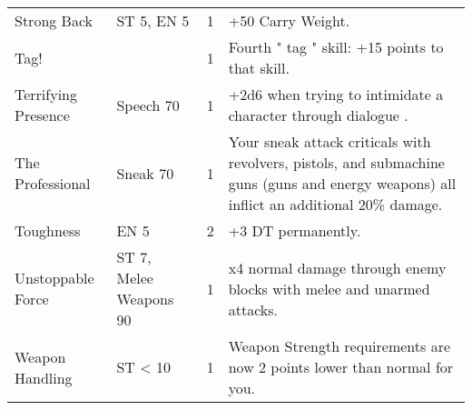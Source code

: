 \begin{longtable}{|p{3.3cm}|p{3.1cm}|p{1.2cm}|p{8.4cm}|}
Strong Back  & ST 5, EN 5  & 1  & +50 Carry Weight.  \\
Tag!  &  & 1  & Fourth  " tag "  skill: +15 points to that skill.  \\
Terrifying Presence  & Speech 70  & 1  & +2d6 when trying to intimidate a character through dialogue .  \\
The Professional  & Sneak 70  & 1  & Your sneak attack criticals with revolvers, pistols, and submachine guns (guns and energy weapons) all inflict an additional 20\% damage.  \\
Toughness  & EN 5  & 2  & +3 DT permanently.  \\
Unstoppable Force  & ST 7, Melee Weapons 90  & 1  & x4 normal damage through enemy blocks with melee and unarmed attacks.  \\
Weapon Handling  & ST  <  10  & 1  & Weapon Strength requirements are now 2 points lower than normal for you.  \\

\hline
\end{longtable}
